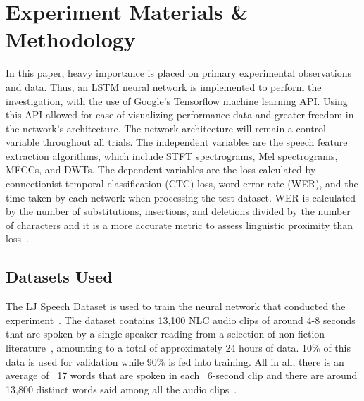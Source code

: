 
\chapter{Experiment Materials \& Methodology} %

\label{ExperimentMaterialsMethodology} %

In this paper, heavy importance is placed on primary experimental observations and data. Thus, an LSTM neural network is implemented to perform the investigation, with the use of Google’s Tensorflow machine learning API. Using this API allowed for ease of visualizing performance data and greater freedom in the network’s architecture. The network architecture will remain a control variable throughout all trials. The independent variables are the speech feature extraction algorithms, which include STFT spectrograms, Mel spectrograms, MFCCs, and DWTs. The dependent variables are the loss calculated by connectionist temporal classification (CTC) loss, word error rate (WER), and the time taken by each network when processing the test dataset. WER is calculated by the number of substitutions, insertions, and deletions divided by the number of characters and it is a more accurate metric to assess linguistic proximity than loss~\cite{wang_acero_chelba_2003}.


\section{Datasets Used}

The LJ Speech Dataset is used to train the neural network that conducted the experiment~\cite{ito_johnson_2017}. The dataset contains 13,100 NLC audio clips of around 4-8 seconds that are spoken by a single speaker reading from a selection of non-fiction literature~\cite{ito_johnson_2017}, amounting to a total of approximately 24 hours of data. 10\% of this data is used for validation while 90\% is fed into training. All in all, there is an average of ~17 words that are spoken in each ~6-second clip and there are around 13,800 distinct words said among all the audio clips~\cite{ito_johnson_2017}.

